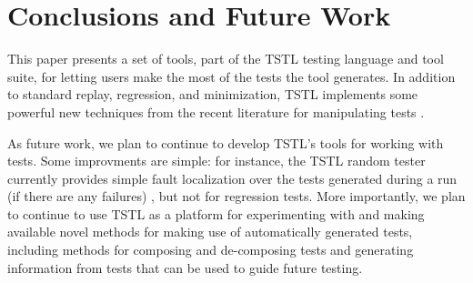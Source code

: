 \section{Conclusions and Future Work}

This paper presents a set of tools, part of the TSTL \cite{tstlsttt}
testing language and tool suite, for letting users make the most of the
tests the tool generates.  In addition to standard
replay, regression, and minimization, TSTL implements some powerful
new techniques from the recent literature for manipulating tests
\cite{OneTest,slippage}.

As future work, we plan to continue to develop TSTL's tools for
working with tests.  Some improvments are simple:  for instance, the TSTL
random tester currently provides simple fault localization over the
tests generated during a run (if there are any failures)
\cite{Tarantula}, but not for regression tests.  More importantly,
we plan to continue to use TSTL as a platform for experimenting with
and making available novel methods for making use of automatically
generated tests, including methods for composing and de-composing
tests and generating information from tests that can be used to guide
future testing.